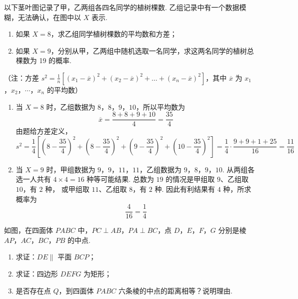 \begin{problem}
以下茎叶图记录了甲，乙两组各四名同学的植树棵数. 乙组记录中有一个数据模糊，无法确认，在图中以 \(X\) 表示.



\begin{enumerate}
\item 如果 \(X = 8\)，求乙组同学植树棵数的平均数和方差；
\item 如果 \(X = 9\)，分别从甲，乙两组中随机选取一名同学，求这两名同学的植树总棵数为 19 的概率.
\end{enumerate}
（注：方差 \( s^2 = \frac{1}{n}\left[(x_1 - \overline{x})^2 + (x_2 - \overline{x})^2 + \ldots + (x_n - \overline{x})^2\right] \)，其中 \(\overline{x}\) 为 \(x_1\)，\(x_2\)，\(\cdots\)，\(x_n\) 的平均数）

\end{problem}

\begin{solution}
\begin{enumerate}
\item 当 \(X=8\) 时，乙组数据为 \(8\)，\(8\)，\(9\)，\(10\)，所以平均数为
\[
\overline{x}=\frac{8+8+9+10}{4}=\frac{35}{4}
\]
由题给方差定义，
\[
s^{2}=\frac{1}{4}\left[
\left(8-\frac{35}{4}\right)^{2}
+\left(8-\frac{35}{4}\right)^{2}
+\left(9-\frac{35}{4}\right)^{2}
+\left(10-\frac{35}{4}\right)^{2}\right]
=\frac{1}{4}\cdot\frac{9+9+1+25}{16}
=\frac{11}{16}
\]
\item 当 \(X=9\) 时，甲组数据为 \(9\)，\(9\)，\(11\)，\(11\)，乙组数据为
\(9\)，\(8\)，\(9\)，\(10\). 从两组各选一人共有 \(4\times4=16\) 种等可能结果.
总数为 \(19\) 的情况是甲组取 \(9\)、乙组取 \(10\)，有 \(2\) 种，
或甲组取 \(11\)、乙组取 \(8\)，有 \(2\) 种. 因此有利结果有
\(4\) 种，所求概率为
\[
\frac{4}{16}=\frac{1}{4}
\]
\end{enumerate}
\end{solution}

\begin{problem}
如图，在四面体 \(PABC\) 中，\(PC \perp AB\)，\(PA \perp BC\)，点 \(D\)，\(E\)，\(F\)，\(G\) 分别是棱 \(AP\)，\(AC\)，\(BC\)，\(PB\) 的中点.

\begin{enumerate}
\item 求证：\(DE \parallel\) 平面 \(BCP\)；
\item 求证：四边形 \(DEFG\) 为矩形；
\item 是否存在点 \(Q\)，到四面体 \(PABC\) 六条棱的中点的距离相等？说明理由.
\end{enumerate}

\end{problem}

